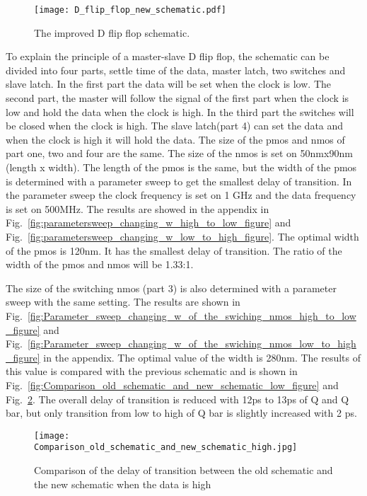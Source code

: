 \begin{figure}[h]
\texttt{[image: D\_flip\_flop\_new\_schematic.pdf]}
\caption{The improved D flip flop schematic.}
\label{fig:D_flip_flop_schematic_figure}
\end{figure}

To explain the principle of a master-slave D flip flop, the schematic can be divided into four parts, settle time of the data, master latch, two switches and slave latch. In the first part the data will be set when the clock is low. The second part, the master will follow the signal of the first part when the clock is low and hold the data when the clock is high. In the third part the switches will be closed when the clock is high. The slave latch(part 4) can set the data and when the clock is high it will hold the data.
The size of the pmos and nmos of part one, two and four are the same. The size of the nmos is set on 50nmx90nm (length x width). The length of the pmos is the same, but the width of the pmos is determined with a parameter sweep to get the smallest delay of transition. In the parameter sweep the clock frequency is set on 1 GHz and the data frequency is set on 500MHz. The results are showed in the appendix in Fig.~\ref{fig:parametersweep_changing_w_high_to_low_figure} and Fig.~\ref{fig:parametersweep_changing_w_low_to_high_figure}. The optimal width of the pmos is 120nm. It has the smallest delay of transition.  The ratio of the width of the pmos and nmos will be 1.33:1.

The size of the switching nmos (part 3) is also determined with a parameter sweep with the same setting. The results are shown in Fig.~\ref{fig:Parameter_sweep_changing_w_of_the_swiching_nmos_high_to_low_figure} and Fig.~\ref{fig:Parameter_sweep_changing_w_of_the_swiching_nmos_low_to_high_figure} in the appendix. The optimal value of the width is 280nm. The results of this value is compared with the previous schematic and is shown in Fig.~\ref{fig:Comparison_old_schematic_and_new_schematic_low_figure} and Fig.~\ref{fig:Comparison_old_schematic_and_new_schematic_high_figure}. The overall delay of transition is reduced with 12ps to 13ps of Q and Q bar, but only transition from low to high of Q bar is slightly increased with 2 ps. 

\begin{figure}[h]
\texttt{[image: Comparison\_old\_schematic\_and\_new\_schematic\_high.jpg]}
\caption{Comparison of the delay of transition between the old schematic and the new schematic when the data is high }
\label{fig:Comparison_old_schematic_and_new_schematic_high_figure}
\end{figure}


